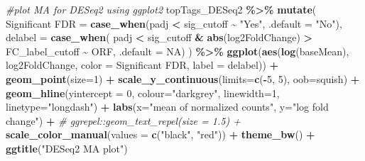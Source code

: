 \documentclass[
]{book}
\newenvironment{Shaded}{\begin{snugshade}}{\end{snugshade}}
\newcommand{\AttributeTok}[1]{\textcolor[rgb]{0.13,0.29,0.53}{#1}}
\newcommand{\CommentTok}[1]{\textcolor[rgb]{0.56,0.35,0.01}{\textit{#1}}}
\newcommand{\ConstantTok}[1]{\textcolor[rgb]{0.56,0.35,0.01}{#1}}
\newcommand{\DecValTok}[1]{\textcolor[rgb]{0.00,0.00,0.81}{#1}}
\newcommand{\FunctionTok}[1]{\textcolor[rgb]{0.13,0.29,0.53}{\textbf{#1}}}
\newcommand{\NormalTok}[1]{#1}
\newcommand{\OtherTok}[1]{\textcolor[rgb]{0.56,0.35,0.01}{#1}}
\newcommand{\SpecialCharTok}[1]{\textcolor[rgb]{0.81,0.36,0.00}{\textbf{#1}}}
\newcommand{\StringTok}[1]{\textcolor[rgb]{0.31,0.60,0.02}{#1}}
\begin{document}
\begin{Shaded}
\begin{Highlighting}[]
\CommentTok{\#plot MA for DESeq2 using ggplot2}
\NormalTok{topTags\_DESeq2 }\SpecialCharTok{\%\textgreater{}\%}
  \FunctionTok{mutate}\NormalTok{(}
    \StringTok{\textasciigrave{}}\AttributeTok{Significant FDR}\StringTok{\textasciigrave{}} \OtherTok{=} \FunctionTok{case\_when}\NormalTok{(padj }\SpecialCharTok{\textless{}}\NormalTok{ sig\_cutoff }\SpecialCharTok{\textasciitilde{}} \StringTok{"Yes"}\NormalTok{,}
                                  \AttributeTok{.default =} \StringTok{"No"}\NormalTok{),}
    \AttributeTok{delabel =} \FunctionTok{case\_when}\NormalTok{(}
\NormalTok{      padj }\SpecialCharTok{\textless{}}\NormalTok{ sig\_cutoff }\SpecialCharTok{\&} \FunctionTok{abs}\NormalTok{(log2FoldChange) }\SpecialCharTok{\textgreater{}}\NormalTok{ FC\_label\_cutoff }\SpecialCharTok{\textasciitilde{}}\NormalTok{ ORF,}
      \AttributeTok{.default =} \ConstantTok{NA}\NormalTok{)}
\NormalTok{  ) }\SpecialCharTok{\%\textgreater{}\%} 
  \FunctionTok{ggplot}\NormalTok{(}\FunctionTok{aes}\NormalTok{(}\FunctionTok{log}\NormalTok{(baseMean), log2FoldChange, }\AttributeTok{color =} \StringTok{\textasciigrave{}}\AttributeTok{Significant FDR}\StringTok{\textasciigrave{}}\NormalTok{, }\AttributeTok{label =}\NormalTok{ delabel)) }\SpecialCharTok{+}
    \FunctionTok{geom\_point}\NormalTok{(}\AttributeTok{size=}\DecValTok{1}\NormalTok{) }\SpecialCharTok{+} 
    \FunctionTok{scale\_y\_continuous}\NormalTok{(}\AttributeTok{limits=}\FunctionTok{c}\NormalTok{(}\SpecialCharTok{{-}}\DecValTok{5}\NormalTok{, }\DecValTok{5}\NormalTok{), }\AttributeTok{oob=}\NormalTok{squish) }\SpecialCharTok{+} 
    \FunctionTok{geom\_hline}\NormalTok{(}\AttributeTok{yintercept =} \DecValTok{0}\NormalTok{, }\AttributeTok{colour=}\StringTok{"darkgrey"}\NormalTok{, }\AttributeTok{linewidth=}\DecValTok{1}\NormalTok{, }\AttributeTok{linetype=}\StringTok{"longdash"}\NormalTok{) }\SpecialCharTok{+}
    \FunctionTok{labs}\NormalTok{(}\AttributeTok{x=}\StringTok{"mean of normalized counts"}\NormalTok{, }\AttributeTok{y=}\StringTok{"log fold change"}\NormalTok{) }\SpecialCharTok{+}
    \CommentTok{\# ggrepel::geom\_text\_repel(size = 1.5) +}
    \FunctionTok{scale\_color\_manual}\NormalTok{(}\AttributeTok{values =} \FunctionTok{c}\NormalTok{(}\StringTok{"black"}\NormalTok{, }\StringTok{"red"}\NormalTok{)) }\SpecialCharTok{+}
    \FunctionTok{theme\_bw}\NormalTok{() }\SpecialCharTok{+}
    \FunctionTok{ggtitle}\NormalTok{(}\StringTok{"DESeq2 MA plot"}\NormalTok{)}
  

\end{Highlighting}
\end{Shaded}
\end{document}
